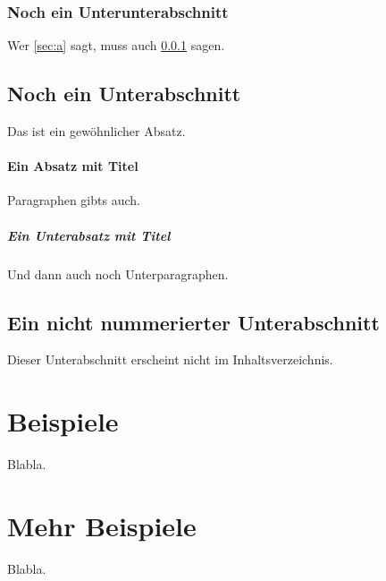 \documentclass[11pt,a4paper,twoside,openright]{scrbook}
\begin{document}
\subsubsection{Noch ein Unterunterabschnitt}
\label{sec:b}

Wer \ref{sec:a} sagt, muss auch \ref{sec:b} sagen.

\subsection{Noch ein Unterabschnitt}

Das ist ein gewöhnlicher Absatz.

\paragraph{Ein Absatz mit Titel}
Paragraphen gibts auch.

\subparagraph{Ein Unterabsatz mit Titel}
Und dann auch noch Unterparagraphen.

\subsection*{Ein nicht nummerierter Unterabschnitt}
Dieser Unterabschnitt erscheint nicht im Inhaltsverzeichnis.
\newpage

\section{Beispiele}
Blabla.
\newpage

\section{Mehr Beispiele}
Blabla.
\newpage










\newpage

\listoffigures
\newpage

\listoftables
\newpage

\end{document}

